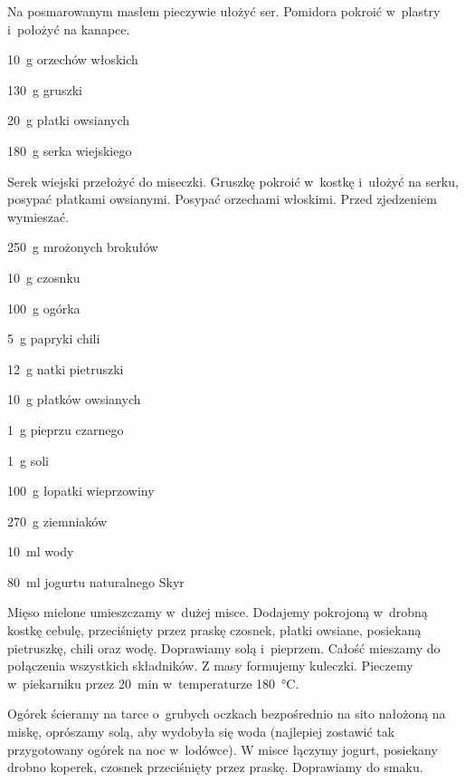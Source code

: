 \documentclass[../kucharek.tex]{subfiles}
\begin{document}
Na posmarowanym masłem pieczywie ułożyć ser. Pomidora pokroić w~plastry
i~położyć na kanapce.


\begin{Ingred}
    \item \qty{10}{\gram} orzechów włoskich
    \item \qty{130}{\gram} gruszki
    \item \qty{20}{\gram} płatki owsianych
    \item \qty{180}{\gram} serka wiejskiego
\end{Ingred}

Serek wiejski przełożyć do miseczki. Gruszkę pokroić w~kostkę i~ułożyć na
serku, posypać płatkami owsianymi. Posypać orzechami włoskimi. Przed zjedzeniem
wymieszać.


\begin{Ingred}
    \item \qty{250}{\gram} mrożonych brokułów
    \item \qty{10}{\gram} czosnku
    \item \qty{100}{\gram} ogórka
    \item \qty{5}{\gram} papryki chili
    \item \qty{12}{\gram} natki pietruszki
    \item \qty{10}{\gram} płatków owsianych
    \item \qty{1}{\gram} pieprzu czarnego
    \item \qty{1}{\gram} soli
    \item \qty{100}{\gram} łopatki wieprzowiny
    \item \qty{270}{\gram} ziemniaków
    \item \qty{10}{\milli\litre} wody
    \item \qty{80}{\milli\litre} jogurtu naturalnego Skyr
\end{Ingred}

Mięso mielone umieszczamy w~dużej misce. Dodajemy pokrojoną w~drobną kostkę
cebulę, przeciśnięty przez praskę czosnek, płatki owsiane, posiekaną
pietruszkę, chili oraz wodę. Doprawiamy solą i~pieprzem. Całość mieszamy do
połączenia wszystkich składników. Z masy formujemy kuleczki. Pieczemy
w~piekarniku przez \qty{20}{\minute} w~temperaturze \qty{180}{\celsius}.

Ogórek ścieramy na tarce o~grubych oczkach bezpośrednio na sito nałożoną na
miskę, oprószamy solą, aby wydobyła się woda (najlepiej zostawić tak
przygotowany ogórek na noc w~lodówce). W misce łączymy jogurt, posiekany drobno
koperek, czosnek przeciśnięty przez praskę. Doprawiamy do smaku.
\end{document}

